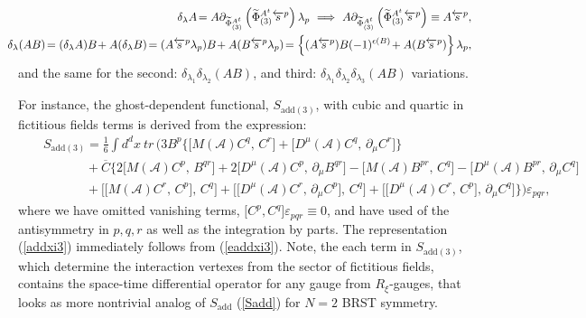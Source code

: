 \documentclass[10pt]{article}
\begin{document}
\begin{eqnarray}\label{varAs}
  &\hspace{-1em}&\hspace{-1em} \delta_{\lambda}A \hspace{-0.15em}= A \partial_{\widetilde{\Phi}{}^{A^t}_{(3)}} \left(\widetilde{\Phi}{}^{A^t}_{(3)} \overleftarrow{s}{}^{p}\right) \lambda_p \  \Longrightarrow \  A \partial_{\widetilde{\Phi}{}^{A^t}_{(3)}} \left(\widetilde{\Phi}{}^{A^t}_{(3)} \overleftarrow{s}{}^{p}\right) \equiv A \overleftarrow{s}{}^{p}, \\
  &\hspace{-1em}&\hspace{-1em} \delta_{\lambda}(AB)\hspace{-0.15em}=(\delta_{\lambda}A)B\hspace{-0.15em}+A(\delta_{\lambda}B) \hspace{-0.15em}= (A \overleftarrow{s}{}^{p}\lambda_p )  B\hspace{-0.15em} + A ( B\overleftarrow{s}{}^{p}\lambda_p ) \hspace{-0.15em}= \left\{(A \overleftarrow{s}{}^{p})  B(  -1)^{\epsilon(B)}\hspace{-0.15em}+ A ( B\overleftarrow{s}{}^{p} )\right\}\lambda_p,\label{varABs}
\end{eqnarray}
and the same for the second:  $\delta_{\lambda_1}\delta_{\lambda_2}(AB)$, and third: $\delta_{\lambda_1}\delta_{\lambda_2}\delta_{\lambda_3}(AB)$ variations.

For instance, the ghost-dependent  functional, $S_{\mathrm{add}(3)}$, with cubic and quartic in fictitious fields  terms is derived from the expression:
\begin{eqnarray}
   &&  S_{\mathrm{add}(3)} =  \frac{1 }{ 6}\int d^{d}x\ tr\,   \Big(3B^p \Big\{\big[M(\mathcal{A}) C^q,\, C^r\big]  + \big[D^\mu(\mathcal{A}) C^q,\,  \partial_\mu C^r\big] \Big\}   \label{eaddxi3} \\
 &&  \phantom{ S_{add(3)}} +  \overline{C} \Big\{2\big[M(\mathcal{A}) C^p,\, B^{qr}\big]  + 2\big[D^\mu(\mathcal{A}) C^p,\,  \partial_\mu B^{qr}\big]
 - \big[M(\mathcal{A}) B^{pr},\, C^q \big]  -\big[D^\mu(\mathcal{A}) B^{pr},\,  \partial_\mu C^q\big]
\nonumber\\
&&\phantom{ S_{add(3)}}  +     \big[\big[M(\mathcal{A}) C^r,\,C^p\big] ,\,C^q\big]  +     \big[\big[D^\mu(\mathcal{A}) C^r,\,\partial_\mu C^p\big] ,\,C^q\big]+  \big[\big[D^\mu(\mathcal{A}) C^r,\, C^p\big] ,\,\partial_\mu C^q\big]\Big\}   \Big)\varepsilon_{pqr},\nonumber
\end{eqnarray}
where we have omitted vanishing  terms, $\big[C^{p}, C^{q}\big]\varepsilon_{pqr} \equiv 0$,  and have used of the antisymmetry in $p,q,r$ as well as the integration by parts. The representation (\ref{addxi3}) immediately follows from (\ref{eaddxi3}).
Note, the each term in $S_{\mathrm{add}(3)}$, which determine the interaction vertexes from the sector of fictitious fields,  contains  the space-time differential operator for any gauge from $R_\xi$-gauges, that looks as more  nontrivial analog of  $S_{\mathrm{add}}$ (\ref{Sadd}) for $N=2$ BRST symmetry.
\end{document}
